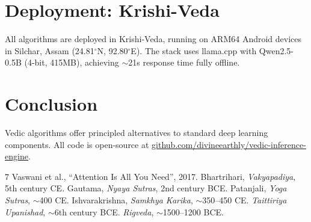 \documentclass[12pt,a4paper]{article}
\begin{document}
\section{Deployment: Krishi-Veda}
All algorithms are deployed in Krishi-Veda, running on ARM64 Android devices in Silchar, Assam (24.81$^\circ$N, 92.80$^\circ$E). The stack uses llama.cpp with Qwen2.5-0.5B (4-bit, 415MB), achieving $\sim$21s response time fully offline.

\section{Conclusion}
Vedic algorithms offer principled alternatives to standard deep learning components. All code is open-source at \url{github.com/divineearthly/vedic-inference-engine}.

\begin{thebibliography}{7}
 Vaswani et al., ``Attention Is All You Need'', 2017.
 Bhartrihari, \textit{Vakyapadiya}, 5th century CE.
 Gautama, \textit{Nyaya Sutras}, 2nd century BCE.
 Patanjali, \textit{Yoga Sutras}, $\sim$400 CE.
 Ishvarakrishna, \textit{Samkhya Karika}, $\sim$350--450 CE.
 \textit{Taittiriya Upanishad}, $\sim$6th century BCE.
 \textit{Rigveda}, $\sim$1500--1200 BCE.
\end{thebibliography}
\end{document}
